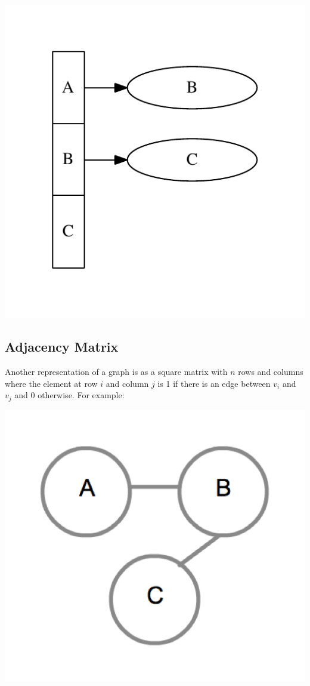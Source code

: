 {
  \includegraphics[scale=1.0]{AdjacencyListDigraph}
  \label{fig:AdjacencyListDigraph}
}

\subsection{Adjacency Matrix}

Another representation of a graph is as a square matrix with $n$ rows
and columns where the element at row $i$ and column $j$ is 1 if there
is an edge between $v_i$ and $v_j$ and 0 otherwise.  For example:

{
  \includegraphics[scale=0.2]{SimpleGraph}
  \label{fig:SimpleGraph}
}

